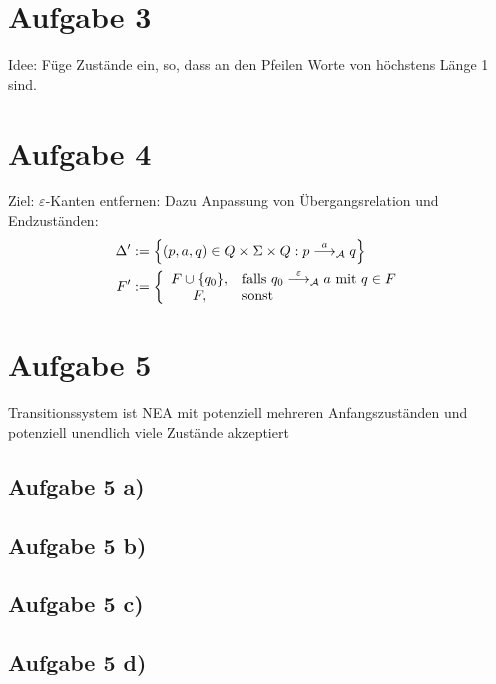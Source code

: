 \documentclass[12pt,a4paper]{article}
\begin{document}
\section*{Aufgabe 3}
Idee: Füge Zustände ein, so, dass an den Pfeilen Worte von höchstens Länge 1 sind.

\section*{Aufgabe 4}
Ziel: $\varepsilon$-Kanten entfernen: Dazu Anpassung von Übergangsrelation und Endzuständen:
\begin{align*}
\Delta'&:=\left\lbrace(p,a,q)\in Q\times\Sigma\times Q:p\stackrel{a}{\longrightarrow}_\mathcal{A} q\right\rbrace\\
F'&:=\left\lbrace\begin{array}{cl}
F\cup\lbrace q_0\rbrace, &\text{falls } q_0\stackrel{\varepsilon}{\longrightarrow}_\mathcal{A} a\text{ mit } q\in F\\
F, &\text{sonst }
\end{array}\right.
\end{align*}

\section*{Aufgabe 5}
Transitionssystem ist NEA mit potenziell mehreren Anfangszuständen und potenziell unendlich viele Zustände akzeptiert
\subsection*{Aufgabe 5 a)}
\subsection*{Aufgabe 5 b)}
\subsection*{Aufgabe 5 c)}
\subsection*{Aufgabe 5 d)}
\end{document}
